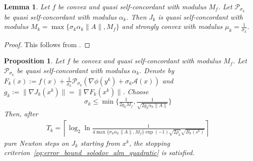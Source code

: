 \documentclass[11pt,onecolumn]{article}
\newtheorem{lemma}[lemma]{Lemma}
\newtheorem{proposition}[proposition]{Proposition}
\theoremstyle{remark}
\begin{document}
\begin{lemma} \label{thm:qsc}
Let $f$ be convex and quasi self-concordant with modulus $M_f$. Let $\mathcal{P}_{\sigma_k}$ be quasi self-concordant with modulus $\alpha_k$. Then $J_k$ is quasi self-concordant with modulus $M_k=\max\{\sigma_k \alpha_k \|A\|, M_f\}$ and strongly convex with modulus $\mu_k=\frac{1}{\sigma_k}$. 
\end{lemma}
\begin{proof}
This follows from \cite{doikov2025minimizing}.
\end{proof}

\begin{proposition} \label{thm:complexity_superlinear_qsc}
    Let $f$ be convex and quasi self-concordant with modulus $M_f$. Let $\mathcal{P}_{\sigma_k}$ be quasi self-concordant with modulus $\alpha_k$. Denote by $F_k(x):=f(x)+\frac{1}{\sigma_k}\mathcal{P}_{\sigma_k}(\nabla \phi(y^k) + \sigma_k \mathcal{A}(x))$ and $g_k := \|\nabla J_k(x^k)\|=\|\nabla F_k(x^k)\|$. Choose
\begin{equation} \label{eq:choice_tauk}
    \sigma_k \leq \min\Big\{\tfrac{1}{2 g_k M_f}, \tfrac{1}{\sqrt{2 g_k \alpha_k \|A\|}} \Big\}
\end{equation}
Then, after
\begin{align}
    T_k = \left\lceil \log_2  \ln \tfrac{1}{4 \max\{\sigma_k \alpha_k \|A\|, M_f\}\exp(-1) \sqrt{2 \rho_k}\sqrt{B_k(s^k)}} \right\rceil
\end{align}
pure Newton steps on $J_k$ starting from $x^k$, the stopping criterion~\cref{eq:error_bound_solodov_alm_quadratic} is satisfied.
\end{proposition}
\end{document}
